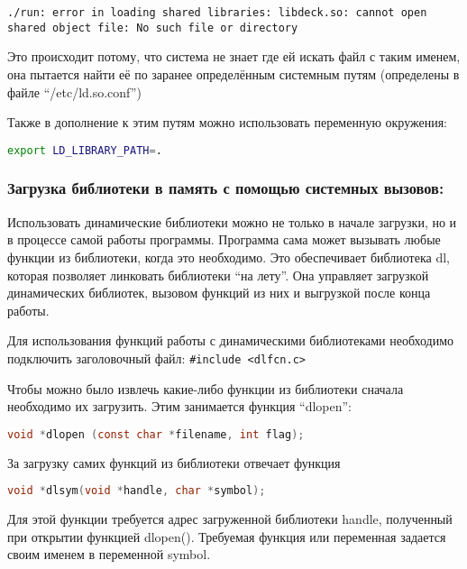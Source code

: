\documentclass[12pt]{article}
\begin{document}
\begin{lstlisting}
./run: error in loading shared libraries: libdeck.so: cannot open 
shared object file: No such file or directory
\end{lstlisting}

Это происходит потому, что система не знает где ей искать файл с таким именем, она пытается найти её по заранее определённым системным путям (определены в файле ``/etc/ld.so.conf'')

Также в дополнение к этим путям можно использовать переменную окружения: 

\begin{lstlisting}[language=bash]
export LD_LIBRARY_PATH=.
\end{lstlisting}

\subsubsection*{Загрузка библиотеки в память с помощью системных вызовов:}

Использовать динамические библиотеки можно не только в начале загрузки, но и в процессе самой работы программы. Программа сама может вызывать любые функции из библиотеки, когда это необходимо. Это обеспечивает библиотека dl, которая позволяет линковать библиотеки ``на лету''. Она управляет загрузкой динамических библиотек, вызовом функций из них и выгрузкой после конца работы.

Для использования функций работы с динамическими библиотеками необходимо подключить заголовочный файл: 
\lstinline|#include <dlfcn.c>|

Чтобы можно было извлечь какие-либо функции из библиотеки сначала необходимо их загрузить. Этим занимается функция ``dlopen'':
\begin{lstlisting}[language=c]
void *dlopen (const char *filename, int flag);
\end{lstlisting}

За загрузку самих функций из библиотеки отвечает функция

\begin{lstlisting}[language=c]
void *dlsym(void *handle, char *symbol);
\end{lstlisting}

Для этой функции требуется адрес загруженной библиотеки handle, полученный при открытии функцией dlopen(). Требуемая функция или переменная задается своим именем в переменной symbol.
\newline
\end{document}

